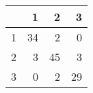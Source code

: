 \begin{tabular}{rrrr}
  \hline
 & 1 & 2 & 3 \\ 
  \hline
1 &  34 &   2 &   0 \\ 
  2 &   3 &  45 &   3 \\ 
  3 &   0 &   2 &  29 \\ 
   \hline
\end{tabular}

